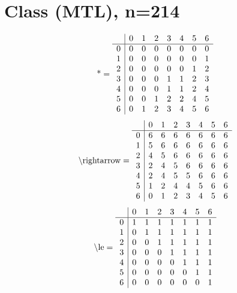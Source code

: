 \documentclass[11pt]{article}
\begin{document}
\section{Class (MTL), n=214}
\[\text{*} = 
\begin{array}{r | r r r r r r r}
 & 0 & 1 & 2 & 3 & 4 & 5 & 6 \\ \hline
0 & 0 & 0 & 0 & 0 & 0 & 0 & 0 \\
1 & 0 & 0 & 0 & 0 & 0 & 0 & 1 \\
2 & 0 & 0 & 0 & 0 & 0 & 1 & 2 \\
3 & 0 & 0 & 0 & 1 & 1 & 2 & 3 \\
4 & 0 & 0 & 0 & 1 & 1 & 2 & 4 \\
5 & 0 & 0 & 1 & 2 & 2 & 4 & 5 \\
6 & 0 & 1 & 2 & 3 & 4 & 5 & 6 \\
\end{array}
\]
\[\text{\textbackslash rightarrow} = 
\begin{array}{r | r r r r r r r}
 & 0 & 1 & 2 & 3 & 4 & 5 & 6 \\ \hline
0 & 6 & 6 & 6 & 6 & 6 & 6 & 6 \\
1 & 5 & 6 & 6 & 6 & 6 & 6 & 6 \\
2 & 4 & 5 & 6 & 6 & 6 & 6 & 6 \\
3 & 2 & 4 & 5 & 6 & 6 & 6 & 6 \\
4 & 2 & 4 & 5 & 5 & 6 & 6 & 6 \\
5 & 1 & 2 & 4 & 4 & 5 & 6 & 6 \\
6 & 0 & 1 & 2 & 3 & 4 & 5 & 6 \\
\end{array}
\]
\[\text{\textbackslash le} = 
\begin{array}{r | r r r r r r r}
 & 0 & 1 & 2 & 3 & 4 & 5 & 6 \\ \hline
0 & 1 & 1 & 1 & 1 & 1 & 1 & 1 \\
1 & 0 & 1 & 1 & 1 & 1 & 1 & 1 \\
2 & 0 & 0 & 1 & 1 & 1 & 1 & 1 \\
3 & 0 & 0 & 0 & 1 & 1 & 1 & 1 \\
4 & 0 & 0 & 0 & 0 & 1 & 1 & 1 \\
5 & 0 & 0 & 0 & 0 & 0 & 1 & 1 \\
6 & 0 & 0 & 0 & 0 & 0 & 0 & 1 \\
\end{array}
\]
\end{document}
